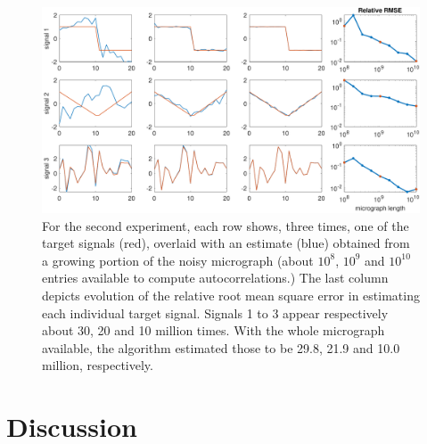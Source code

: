 \documentclass[english,11pt]{article}
\newcommand{\1}{\mathbf{1}}
\newcommand{\TODO}[1]{{\color{red}{[#1]}}}
\numberwithin{equation}{section}
\theoremstyle{plain}
\theoremstyle{definition}
\theoremstyle{remark}
\theoremstyle{plain}
\theoremstyle{remark}
\theoremstyle{plain}
\theoremstyle{plain}
\newcommand{\SNR}{\ensuremath{\textsf{SNR}}}
\begin{document}
\begin{figure}[t]
	\centering
	\includegraphics[width=\linewidth]{heterogeneous_progressive_n12300000000_466300}
	\caption{For the second experiment, each row shows, three times, one of the target signals (red), overlaid with an estimate (blue) obtained from a growing portion of the noisy micrograph (about $10^8$, $10^9$ and $10^{10}$ entries available to compute autocorrelations.) The last column depicts evolution of the relative root mean square error in estimating each individual target signal. Signals 1 to 3 appear respectively about 30, 20 and 10 million times. With the whole micrograph available, the algorithm estimated those to be 29.8, 21.9 and 10.0 million, respectively.
%		
	}
	\label{fig:1Dheterosignals}
\end{figure}



\clearpage
\section{Discussion}


\end{document}
